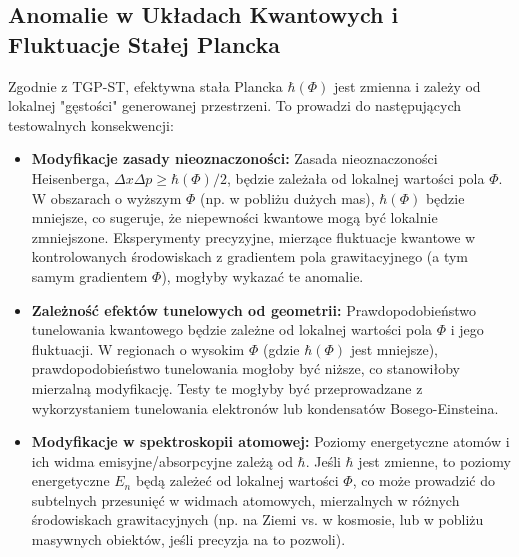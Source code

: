 \documentclass[11pt,a4paper]{article}
\begin{document}
\subsection{Anomalie w Układach Kwantowych i Fluktuacje Stałej Plancka}
Zgodnie z TGP-ST, efektywna stała Plancka $\hbar(\Phi)$ jest zmienna i zależy od lokalnej "gęstości" generowanej przestrzeni. To prowadzi do następujących testowalnych konsekwencji:
\begin{itemize}
    \item \textbf{Modyfikacje zasady nieoznaczoności:} Zasada nieoznaczoności Heisenberga, $\Delta x \Delta p \ge \hbar(\Phi)/2$, będzie zależała od lokalnej wartości pola $\Phi$. W obszarach o wyższym $\Phi$ (np. w pobliżu dużych mas), $\hbar(\Phi)$ będzie mniejsze, co sugeruje, że niepewności kwantowe mogą być lokalnie zmniejszone. Eksperymenty precyzyjne, mierzące fluktuacje kwantowe w kontrolowanych środowiskach z gradientem pola grawitacyjnego (a tym samym gradientem $\Phi$), mogłyby wykazać te anomalie.
    \item \textbf{Zależność efektów tunelowych od geometrii:} Prawdopodobieństwo tunelowania kwantowego będzie zależne od lokalnej wartości pola $\Phi$ i jego fluktuacji. W regionach o wysokim $\Phi$ (gdzie $\hbar(\Phi)$ jest mniejsze), prawdopodobieństwo tunelowania mogłoby być niższe, co stanowiłoby mierzalną modyfikację. Testy te mogłyby być przeprowadzane z wykorzystaniem tunelowania elektronów lub kondensatów Bosego-Einsteina.
    \item \textbf{Modyfikacje w spektroskopii atomowej:} Poziomy energetyczne atomów i ich widma emisyjne/absorpcyjne zależą od $\hbar$. Jeśli $\hbar$ jest zmienne, to poziomy energetyczne $E_n$ będą zależeć od lokalnej wartości $\Phi$, co może prowadzić do subtelnych przesunięć w widmach atomowych, mierzalnych w różnych środowiskach grawitacyjnych (np. na Ziemi vs. w kosmosie, lub w pobliżu masywnych obiektów, jeśli precyzja na to pozwoli).

\end{itemize}
\end{document}
